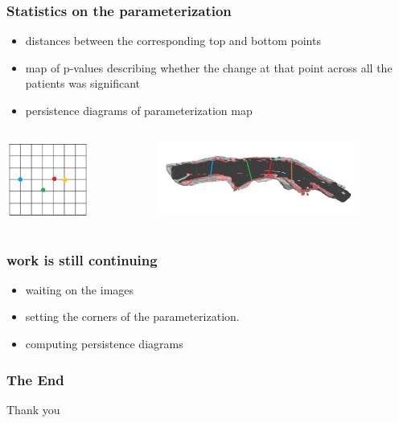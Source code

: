 \documentclass{beamer} %
\theoremstyle{definition} %
\begin{document}
\begin{frame}
\frametitle{Statistics on the parameterization}

\begin{itemize}

\item distances between the corresponding top and bottom points

\item map of p-values describing whether the change at that point across all the patients was significant  

\item persistence diagrams of parameterization map
\end{itemize}


\begin{columns}
\begin{column}{0.25\textwidth}
\begin{center}
\includegraphics[height=2.5cm, ]{../images/unit_square.png}
\end{center}
\end{column}
\begin{column}{0.75\textwidth}

\begin{center}
\includegraphics[height=2.5cm, ]{../images/cross_section00.png}
\end{center}
\end{column}

\end{columns}
\end{frame}


\begin{frame}

\frametitle{work is still continuing}
\begin{itemize}
\item waiting on the images
\item setting the corners of the parameterization.
\item computing persistence diagrams

\end{itemize}

\end{frame}


\begin{frame}
\frametitle{The End}
\begin{center}
Thank you
\end{center}
\end{frame}
\end{document}
